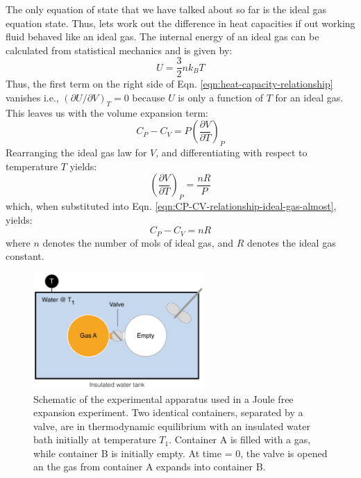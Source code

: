 \documentclass[11pt]{article}
\theoremstyle{definition}
\begin{document}
The only equation of state that we have talked about so far is the ideal gas equation state.
Thus, lets work out the difference in heat capacities if out working fluid behaved like an ideal gas.
The internal energy of an ideal gas can be calculated from statistical mechanics and is given by:
\begin{equation}
	U = \frac{3}{2}nk_{B}T
\end{equation}Thus, the first term on the right side of Eqn. \eqref{eqn:heat-capacity-relationship} vanishes i.e., $\left(\partial{U}/\partial{V}\right)_{T} = 0$ because
$U$ is only a function of $T$ for an ideal gas. This leaves us with the volume expansion term:
\begin{equation}\label{eqn:CP-CV-relationship-ideal-gas-almost}
	C_{P} - C_{V} = P\left(\frac{\partial{V}}{\partial{T}}\right)_{P}
\end{equation}Rearranging the ideal gas law for $V$, and differentiating with respect to temperature $T$ yields:
\begin{equation}
	\left(\frac{\partial{V}}{\partial{T}}\right)_{P} = \frac{nR}{P}
\end{equation}which, when substituted into Eqn. \eqref{eqn:CP-CV-relationship-ideal-gas-almost}, yields:
\begin{equation}
	C_{P} - C_{V} = nR
\end{equation}where $n$ denotes the number of mols of ideal gas, and $R$ denotes the ideal gas constant.

\clearpage

\begin{figure}\center
\includegraphics[width=0.58\textwidth]{./figs/JouleExpansion.pdf}
\caption{Schematic of the experimental apparatus used in a Joule free expansion experiment.
Two identical containers, separated by a valve, are in thermodynamic equilibrium with an insulated water bath initially at temperature $T_{1}$.
Container A is filled with a gas, while container B is initially empty.
At time = 0, the valve is opened an the gas from container A expands into container B.}\label{fig-joule-expansion}
\end{figure}
\end{document}
